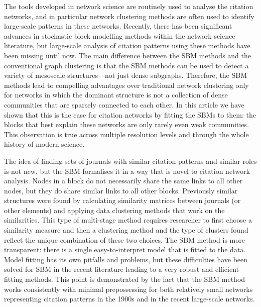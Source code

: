 \documentclass[a4paper,12pt]{article}
\begin{document}
The tools developed in network science are routinely used to analyse the citation networks, and 
in particular network clustering methods are often used to identify large-scale patterns in these networks.
Recently, there has been significant advances in stochastic block modelling methods within the network science literature, 
but large-scale analysis of citation patterns using these methods have been missing until now. The main difference between the SBM methods and the conventional graph clustering 
is that the SBM methods can be used to detect a variety of mesoscale structures---not just dense subgraphs. 
Therefore, the SBM methods lead to compelling advantages over traditional network clustering only for networks in which
the dominant structure is not a collection of dense communities that are sparsely connected to each other.
In this article we have shown that this is the case for citation networks by fitting the SBMs to them: 
the blocks that best explain these networks are only rarely even weak communities.
This observation is true across multiple resolution levels and through the whole history of modern science.

The idea of finding sets of journals with similar citation patterns and similar roles is not new,
but the SBM formalises it in a way that is novel to citation network analysis.
Nodes in a block do not necessarily share the same links to all other nodes, but they do share similar links to
all other blocks. Previously similar structures were found
by calculating similarity matrices between journals (or other elements) and applying data clustering methods that work on the similarities.
This type of multi-stage method  requires researcher to first choose a similarity measure and then a clustering method and the type of clusters found 
reflect the unique combination of these two choices. The SBM method is more transparent: there is a single easy-to-interpret model that is fitted to the data.
Model fitting has its own pitfalls and problems, 
but these difficulties have been solved for SBM
in the recent literature leading to a very robust and efficient fitting methods.
This point is demonstrated by the fact that the SBM method works consistently with minimal prepossessing 
for both relatively small networks representing citation patterns in the 1900s and in the recent large-scale networks. 
\end{document}
